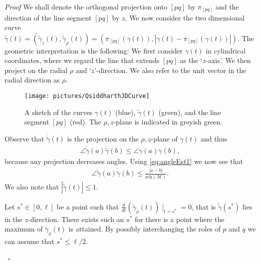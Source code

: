 \documentclass{article}
\newenvironment{proof}[1][{}]{%
  \begin{trivlist}\item[]\textit{Proof #1}\quad}%
  {\hfill\hspace*{\fill}~$\square$\end{trivlist}}
\newcommand{\M}{\mathcal{M}}
\newcommand{\rch}{\mathrm{rch}}
\begin{document}
\begin{proof} 
We shall denote the orthogonal projection onto $[pq]$ by $\pi_{[pq]}$ and the direction of the line segment $[pq]$ by $z$. We now consider the two dimensional curve $\tilde{\gamma}(t)= (\tilde{\gamma}_z(t),\tilde{\gamma}_\rho(t))= (\pi_{[pq]}(\gamma(t)), |\gamma(t)-\pi_{[pq]}(\gamma(t) )| ) $. The geometric interpretation is the following: We first consider $\gamma(t)$ in cylindrical coordinates, where we regard the line that extends $[pq]$ as the `$z$-axis'. We then project on the radial $\rho$ and `$z$'-direction. We also refer to the unit vector in the radial direction as $\rho$. 

\begin{figure}[h!]
\centering
\texttt{[image: pictures/QsiddharthJDCurve]}
\caption{A sketch of the curves $\gamma(t)$ (blue), $\tilde{\gamma}(t)$ (green), and the line segment $[pq]$ (red). The $\rho,z$-plane is indicated in greyish green.}
\label{SketchGamma}
\end{figure}

Observe that $\dot{\tilde{\gamma}}(t)$ is the projection on the $\rho,z$-plane of $\dot{\gamma}(t)$ and thus
\begin{align} 
\angle \dot{\tilde{\gamma}}(a) \dot{\tilde{\gamma}}(b) \leq \angle \dot{\gamma}(a) \dot{\gamma}(b),
\nonumber
\end{align} 
because any projection decreases angles. Using \eqref{eq:angleEst1} we now see that 
\begin{align} 
\angle \dot{\tilde{\gamma}}(a) \dot{\tilde{\gamma}}(b) \leq \frac{|a-b| } {\rch(\M)}.
\label{eq:angleEst2}
\end{align}
We also note that $|\dot{\tilde{\gamma}}(t)|\leq 1$.

Let $s^*\in [0 , \ell]$ be a point such that $ \frac{d}{dt} (\tilde{\gamma}_\rho(t)) \mid_{t=s^*} = 0$, that is $\dot{\tilde{\gamma}}(s^*)$ lies in the $z$-direction. 
There exists such an $s^*$ for there is a point where the maximum of $\tilde{\gamma}_\rho(t)$ is attained. By possibly interchanging the roles of $p$ and $q$ we can assume that $s^*\leq \ell/2$. 


\end{proof}
\end{document}
